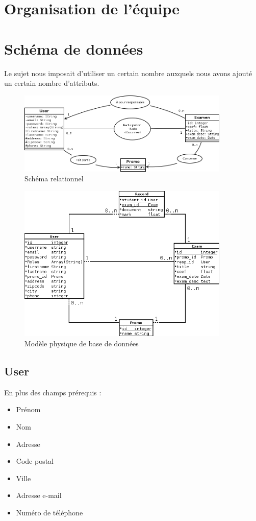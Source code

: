 \documentclass{report}
\begin{document}
  \section{Organisation de l'équipe}
  \section{Schéma de données}
    Le sujet nous imposait d'utiliser un certain nombre 
    auxquels nous avons ajouté un certain nombre d'attributs.

    \begin{figure}
      \caption{Schéma relationnel}
      \includegraphics[width=0.9\textwidth]{./data.png}
    \end{figure}

    \begin{figure}
      \caption{Modèle physique de base de données}
      \includegraphics[width=0.9\textwidth]{./db.png}
    \end{figure}

    \subsection{User}
      En plus des champs prérequis :
      \begin{itemize}
        \item{Prénom}
        \item{Nom}
        \item{Adresse}
        \item{Code postal}
        \item{Ville}
        \item{Adresse e-mail}
        \item{Numéro de téléphone}
      \end{itemize}
\end{document}
